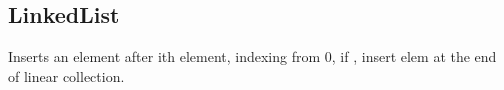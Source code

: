 \subsection{LinkedList}
Inserts an element after ith element, indexing from 0, if , insert elem at the end of linear collection.
%
%
%
%
%
%
%
%
%
